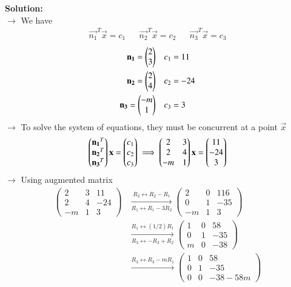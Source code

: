 \documentclass[journal]{IEEEtran}
\begin{document}
\textbf{Solution:}\\
$\rightarrow$ We have
\begin{align*} \vec{n_1}^T\vec{x} = c_1 && \vec{n_2}^T\vec{x} = c_2 && \vec{n_3}^T\vec{x} = c_3 \end{align*}
\begin{align}
    \mathbf{n_1} = \begin{pmatrix}2\\3\end{pmatrix} && c_1 &= 11 \\
    \mathbf{n_2} = \begin{pmatrix}2\\4\end{pmatrix} && c_2 &= -24 \\
    \mathbf{n_3} = \begin{pmatrix}-m\\1\end{pmatrix} && c_3 &= 3
\end{align}
$\rightarrow$ To solve the system of equations, they must be concurrent at a point $\vec{x}$
\begin{align}
    \begin{pmatrix}\mathbf{n_1}^T\\\mathbf{n_2}^T\\\mathbf{n_3}^T\end{pmatrix}\mathbf{x} = \begin{pmatrix}c_1\\c_2\\c_3\end{pmatrix} \implies \begin{pmatrix}2&3\\2&4\\-m&1\end{pmatrix}\mathbf{x} = \begin{pmatrix}11\\-24\\3\end{pmatrix}
\end{align}
$\rightarrow$ Using augmented matrix
\begin{align}
    \left(\begin{array}{cc|c}2&3&11\\2&4&-24\\-m&1&3\end{array}\right)
    &\xrightarrow[R_1 \leftrightarrow R_1 - 3R_2]{R_2 \leftrightarrow R_2 - R_1} \left(\begin{array}{cc|c}2&0&116\\0&1&-35\\-m&1&3\end{array}\right) \\
    &\xrightarrow[R_3 \leftrightarrow -R_3 + R_2]{R_1 \leftrightarrow (1/2)R_1}
    \left(\begin{array}{cc|c}1&0&58\\0&1&-35\\m&0&-38\end{array}\right) \\
    &\xrightarrow{R_3 \leftrightarrow R_3 - mR_1}
    \left(\begin{array}{cc|c}1&0&58\\0&1&-35\\0&0&-38-58m\end{array}\right)
\end{align}
\end{document}

